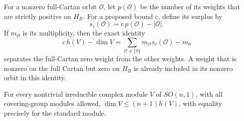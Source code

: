 For a nonzero full-Cartan orbit $\mathcal O$, let
$p(\mathcal O)$ be the number of its weights that are strictly
positive on $H_R$. For a proposed bound $c$, define its surplus by
\[
 s_c(\mathcal O)=c\,p(\mathcal O)-|\mathcal O|.
\]
If $m_{\mathcal O}$ is its multiplicity, then the exact identity
\begin{equation}\label{eq:panels-surplus}
 c\,h(V)-\dim V
 =\sum_{\mathcal O\neq\{0\}}
       m_{\mathcal O}s_c(\mathcal O)-m_0
\end{equation}
separates the full-Cartan zero weight from the other weights. A weight
that is nonzero on the full Cartan but zero on $H_R$ is already
included in its nonzero orbit in this identity.

\begin{lemma}\label{lem:panels-orthogonal-ratio}
For every nontrivial irreducible complex module $V$ of $SO(n,1)$,
with all covering-group modules allowed,
$\dim V\leq(n+1)h(V)$, with equality precisely for the standard
module.
\end{lemma}

